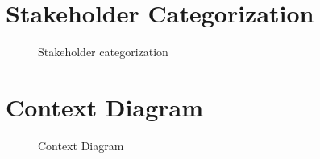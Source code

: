 \appendix
\section{Stakeholder Categorization}
\begin{figure}[!h]
	\vspace{1cm}
	\centering
	\setlength\fboxsep{7pt}
	\setlength\fboxrule{0.5pt}
	\label{appendix_a_stakeholder_categorization}
	\caption{Stakeholder categorization}
\end{figure}
\clearpage
\section{Context Diagram}
\begin{figure}[!h]
	\vspace{1cm}
	\centering
	\setlength\fboxsep{7pt}
	\setlength\fboxrule{0.5pt}
	\label{appendix_b_context_diagram}
	\caption{Context Diagram}
\end{figure}

